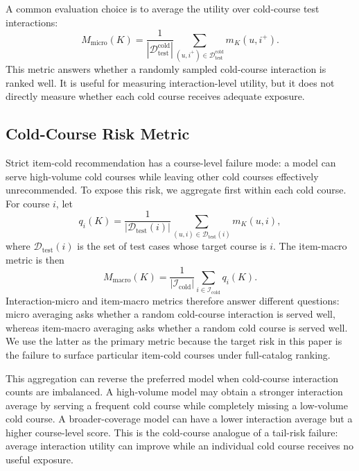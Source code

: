 \documentclass[sigconf,anonymous,review]{acmart}
\begin{document}
A common evaluation choice is to average the utility over cold-course test interactions:
\begin{equation}
M_{\mathrm{micro}}(K)=
\frac{1}{|\mathcal{D}^{\mathrm{cold}}_{\mathrm{test}}|}
\sum_{(u,i^+)\in \mathcal{D}^{\mathrm{cold}}_{\mathrm{test}}}
m_K(u,i^+).
\end{equation}
This metric answers whether a randomly sampled cold-course interaction is ranked well. It is useful for measuring interaction-level utility, but it does not directly measure whether each cold course receives adequate exposure.

\subsection{Cold-Course Risk Metric}
Strict item-cold recommendation has a course-level failure mode: a model can serve high-volume cold courses while leaving other cold courses effectively unrecommended. To expose this risk, we aggregate first within each cold course. For course \(i\), let
\begin{equation}
q_i(K)=
\frac{1}{|\mathcal{D}_{\mathrm{test}}(i)|}
\sum_{(u,i)\in \mathcal{D}_{\mathrm{test}}(i)}
m_K(u,i),
\end{equation}
where \(\mathcal{D}_{\mathrm{test}}(i)\) is the set of test cases whose target course is \(i\). The item-macro metric is then
\begin{equation}
M_{\mathrm{macro}}(K)=
\frac{1}{|\mathcal{I}_{\mathrm{cold}}|}
\sum_{i\in\mathcal{I}_{\mathrm{cold}}} q_i(K).
\end{equation}
Interaction-micro and item-macro metrics therefore answer different questions: micro averaging asks whether a random cold-course interaction is served well, whereas item-macro averaging asks whether a random cold course is served well. We use the latter as the primary metric because the target risk in this paper is the failure to surface particular item-cold courses under full-catalog ranking.

This aggregation can reverse the preferred model when cold-course interaction counts are imbalanced. A high-volume model may obtain a stronger interaction average by serving a frequent cold course while completely missing a low-volume cold course. A broader-coverage model can have a lower interaction average but a higher course-level score. This is the cold-course analogue of a tail-risk failure: average interaction utility can improve while an individual cold course receives no useful exposure.
\end{document}
